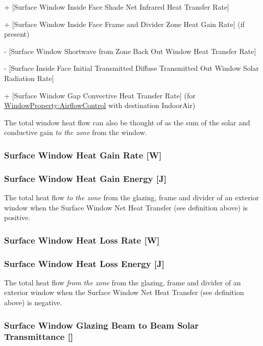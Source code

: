   + {[}Surface Window Inside Face Shade Net Infrared Heat Transfer Rate{]}

  + {[}Surface Window Inside Face Frame and Divider Zone Heat Gain Rate{]} (if present)

  - {[}Surface Window Shortwave from Zone Back Out Window Heat Transfer Rate{]}

  - {[}Surface Inside Face Initial Transmitted Diffuse Transmitted Out Window Solar Radiation Rate{]}
  
  + {[Surface Window Gap Convective Heat Transfer Rate] (for \hyperref[windowpropertyairflowcontrol]{WindowProperty:AirflowControl} with destination IndoorAir)}

The total window heat flow can also be thought of as the sum of the solar and conductive gain \emph{to the zone} from the window.

\subsubsection{Surface Window Heat Gain Rate {[}W{]}}\label{surface-window-heat-gain-rate-w}

\subsubsection{Surface Window Heat Gain Energy {[}J{]}}\label{surface-window-heat-gain-energy-j}

The total heat flow \emph{to the zone} from the glazing, frame and divider of an exterior window when the Surface Window Net Heat Transfer (see definition above) is positive.

\subsubsection{Surface Window Heat Loss Rate {[}W{]}}\label{surface-window-heat-loss-rate-w}

\subsubsection{Surface Window Heat Loss Energy {[}J{]}}\label{surface-window-heat-loss-energy-j}

The total heat flow \emph{from the zone} from the glazing, frame and divider of an exterior window when the Surface Window Net Heat Transfer (see definition above) is negative.

\subsubsection{Surface Window Glazing Beam to Beam Solar Transmittance {[]}}\label{surface-window-glazing-beam-to-beam-solar-transmittance}

